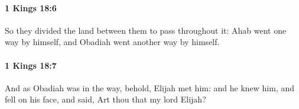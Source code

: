 		\paragraph{1 Kings 18:6} %
			\label{1KINGS-18-6}

			So they divided the land between them to pass throughout it: Ahab went one way by himself, and Obadiah went another way by himself.


		\paragraph{1 Kings 18:7} %
			\label{1KINGS-18-7}

			And as Obadiah was in the way, behold, Elijah met him: and he knew him, and fell on his face, and said, Art thou that my lord Elijah?


